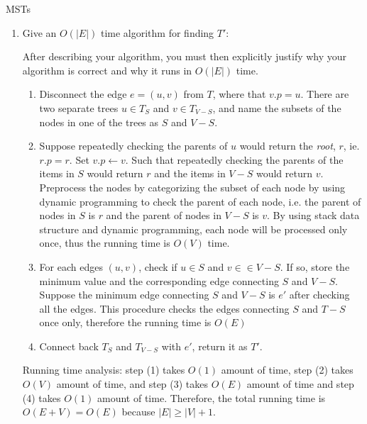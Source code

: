 \documentclass{article}
\numberwithin{table}{section}
\numberwithin{figure}{section}
\begin{document}
\begin{section}{MSTs}
\begin{enumerate}
    \item Give an $O(|E|)$ time algorithm for finding $T'$: 
    
    After describing your algorithm, you must then explicitly justify why your algorithm is correct and why it runs in $O(|E|)$ time.
    
    \begin{tcolorbox}
    \begin{enumerate}[(1), noitemsep]
        \item Disconnect the edge $e = (u,v)$ from $T$, where that $v.p = u$. There are two separate trees $u \in T_S$ and $v \in T_{V-S}$, and name the subsets of the nodes in one of the trees as $S$ and $V-S$.
        \item Suppose repeatedly checking the parents of $u$ would return the \textit{root}, $r$, ie. $r.p = r$. Set $v.p \gets v$. Such that repeatedly checking the parents of the items in $S$ would return $r$ and the items in $V-S$ would return $v$. Preprocess the nodes by categorizing the subset of each node by using dynamic programming to check the parent of each node, i.e. the parent of nodes in $S$ is $r$ and the parent of nodes in $V-S$ is $v$. By using stack data structure and dynamic programming, each node will be processed only once, thus the running time is $O(V)$ time.
        \item For each edges $(u,v)$, check if $u \in S$ and $v \in \in V-S$. If so, store the minimum value and the corresponding edge connecting $S$ and $V-S$. Suppose the minimum edge connecting $S$ and $V-S$ is $e'$ after checking all the edges. This procedure checks the edges connecting $S$ and $T-S$ once only, therefore the running time is $O(E)$
        \item Connect back $T_S$ and $T_{V-S}$ with $e'$, return it as $T'$.
    \end{enumerate}
    
    Running time analysis: step (1) takes $O(1)$ amount of time, step (2) takes $O(V)$ amount of time, and step (3) takes $O(E)$ amount of time and step (4) takes $O(1)$ amount of time. Therefore, the total running time is $O(E+V) = O(E)$ because $|E| \geq |V| + 1$.
    \end{tcolorbox}
\end{enumerate}
\end{section}
\end{document}

